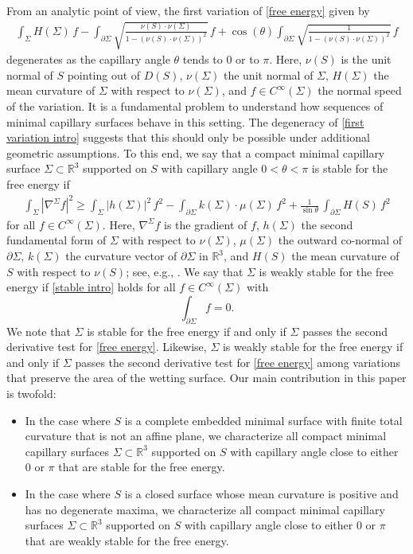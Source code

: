 \documentclass[11pt]{amsart}
\begin{document}
From an analytic point of view, the first variation of \eqref{free energy} given by 
\begin{align} \label{first variation intro} 
\int_{\Sigma}H(\Sigma)\,f-\int_{\partial\Sigma} \sqrt{\frac{\nu(S)\cdot \nu(\Sigma)}{1-(\nu(S)\cdot \nu(\Sigma))^2}}\,f
+\cos(\theta)\int_{\partial \Sigma} \sqrt{\frac{1}{1-(\nu(S)\cdot \nu(\Sigma))^2}}\,f
\end{align}  degenerates as the capillary angle $\theta$ tends to $0$ or to $\pi$. Here, $\nu(S)$ is the unit normal of $S$ pointing out of $D(S)$, $\nu(\Sigma)$ the unit normal of $\Sigma$, $H(\Sigma)$ the mean curvature of $\Sigma$ with respect to $\nu(\Sigma)$, and $f\in C^\infty(\Sigma)$ the normal speed of the variation.  It is a  fundamental problem to understand how sequences of minimal capillary surfaces behave in this setting. The degeneracy of \eqref{first variation intro} suggests that this should only be possible under additional geometric assumptions.  To this end, we say that a compact minimal capillary surface $\Sigma \subset \mathbb{R}^3$ supported on $S$ with capillary angle $0<\theta<\pi$ is stable for the free energy if 
\begin{align} \label{stable intro} 
\int_\Sigma |\nabla^\Sigma f|^2\geq 		\int_\Sigma |h(\Sigma)|^2\,f^2-\int_{\partial \Sigma} k(\Sigma)\cdot\mu(\Sigma)\,f^2+\frac{1}{\sin\theta}\,\int_{\partial \Sigma} H(S)\,f^2
\end{align} 
for all $f\in C^\infty(\Sigma)$. Here, $\nabla^\Sigma f$ is the gradient of $f$, $h(\Sigma)$ the second fundamental form of $\Sigma$ with respect to $\nu(\Sigma)$, $\mu(\Sigma)$ the outward co-normal of $\partial \Sigma$, $k(\Sigma)$ the  curvature vector of $\partial \Sigma$ in $\mathbb{R}^3$, and $H(S)$ the mean curvature of $S$ with respect to $\nu(S)$; see, e.g., \cite{HongSaturnino}. We say that $\Sigma$ is weakly stable for the free energy if \eqref{stable intro} holds for all $f\in C^\infty(\Sigma)$ with 
$$
\int_{\partial \Sigma} f=0.
$$ We note that $\Sigma$ is  stable for the free energy if and only if $\Sigma$ passes the second derivative test for \eqref{free energy}. Likewise, $\Sigma$ is weakly  stable for the free energy if and only if $\Sigma$ passes the second derivative test for \eqref{free energy} among variations that preserve the area of the wetting surface.
 Our main contribution in this paper is twofold:
\begin{itemize}
	\item[$\circ$] In the case where $S$ is a complete embedded minimal surface with finite total curvature that is not an affine plane, we characterize all compact minimal capillary surfaces $\Sigma \subset \mathbb{R}^3$ supported on $S$ with capillary angle close to either $0$ or $\pi$ that are stable for the free energy.
		\item[$\circ$] In the case where $S$ is a closed surface whose mean curvature is positive and has no degenerate maxima, we characterize all compact minimal capillary surfaces $\Sigma\subset \mathbb{R}^3$ supported on $S$ with capillary angle close to either $0$ or $\pi$ that are weakly stable for the free energy.
\end{itemize} 
\end{document}

